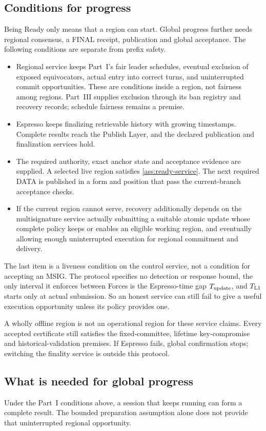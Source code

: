 \documentclass[11pt,a4paper]{article}
\newcounter{protocol}
\begin{document}
\subsection{Conditions for progress}
\label{sec:progress}
Being Ready only means that a region can start. Global progress further
needs regional consensus, a FINAL receipt, publication and global
acceptance. The following conditions are separate from prefix safety.
\begin{itemize}
\item Regional service keeps Part~I's fair leader schedules, eventual
exclusion of exposed equivocators, actual entry into correct turns, and
uninterrupted commit opportunities. These are conditions inside a region,
not fairness among regions. Part~III supplies exclusion through its ban
registry and recovery records; schedule fairness remains a premise.
\item Espresso keeps finalizing retrievable history with growing
timestamps. Complete results reach the Publish Layer, and the declared
publication and finalization services hold.
\item The required authority, exact anchor state and acceptance evidence
are supplied. A selected live region satisfies \cref{ass:ready-service}.
The next required DATA is published in a form and position that pass the
current-branch acceptance checks.
\item If the current region cannot serve, recovery additionally depends
on the multisignature service actually submitting a suitable atomic
update whose complete policy keeps or enables an eligible working region,
and eventually allowing
enough uninterrupted execution for regional commitment and delivery.
\end{itemize}
The last item is a liveness condition on the control service, not a
condition for accepting an MSIG. The protocol specifies no detection or
response bound, the only interval it enforces between Forces is the
Espresso-time gap $T_{\rm update}$, and $T_{\rm L1}$ starts only at actual
submission. So an honest service can still fail to
give a useful execution opportunity unless its policy provides one.

A wholly offline region is not an operational region for these service
claims. Every accepted certificate still satisfies the fixed-committee,
lifetime key-compromise and historical-validation premises. If Espresso fails, global confirmation stops; switching the
finality service is outside this protocol.

\subsection{What is needed for global progress}
\label{sec:global-progress}
Under the Part~I conditions above, a session that keeps running can form
a complete result. The bounded preparation assumption alone does not
provide that uninterrupted regional opportunity.
\end{document}
